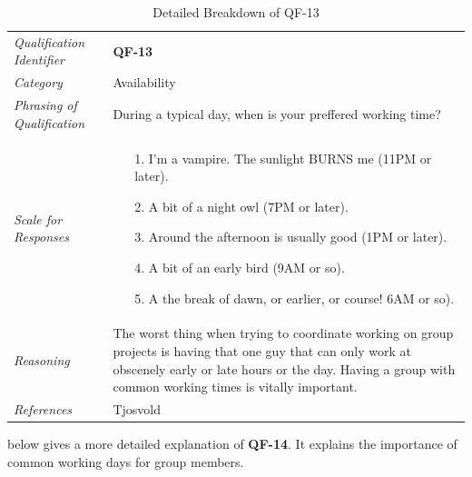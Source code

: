 \documentclass[12pt,letterpaper]{article}
\begin{document}
\begin{table}[H]
	\caption{Detailed Breakdown of QF-13}
	\begin{tabu} to 
		\toprule
		Qualification Identifier & {\bf QF-13}\\
		Category & Availability \\
		Phrasing of Qualification & During a typical day, when is your preffered working time? \\
		Scale for Responses &
		\begin{minipage}[t]{\linewidth}
			\begin{enumerate}
				\item[1.] I'm a vampire. The sunlight BURNS me (11PM or later).
				\item[2.] A bit of a night owl (7PM or later).
				\item[3.] Around the afternoon is usually good (1PM or later).
				\item[4.] A bit of an early bird (9AM or so).
				\item[5.] A the break of dawn, or earlier, or course! 6AM or so).
			\end{enumerate}
		\end{minipage}\\
		Reasoning & The worst thing when trying to coordinate working on group projects is having that one guy that can only work at obscenely early or late hours or the day. Having a group with common working times is vitally important.\\
		References & Tjosvold\cite{tjosvold}\\
		\toprule
	\end{tabu}
\end{table}

 below gives a more detailed explanation of {\bf QF-14}. It explains the importance of common working days for group members.
\end{document}

